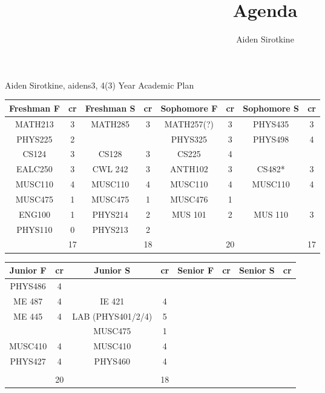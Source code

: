 \documentclass{article}
\date{}
\title{Agenda}
\author{Aiden Sirotkine}
\newcommand{\comment}[1]{}
\begin{document}
Aiden Sirotkine, aidens3, 4(3) Year Academic Plan
\begin{center}
\begin{tabular}{| c | c | c | c | c | c | c | c |}
Freshman F& cr & Freshman S & cr & Sophomore F & cr & Sophomore S & cr  \\ \hline
MATH213 & 3 & MATH285 & 3 & MATH257(?) & 3 & PHYS435& 3\\ \hline
PHYS225 & 2 & & & PHYS325 & 3 & PHYS498 & 4\\ \hline
CS124 & 3 & CS128 & 3 & CS225 & 4 &  & \\ \hline
EALC250 & 3 & CWL 242 & 3 & ANTH102 & 3 & CS482* & 3 \\ \hline
MUSC110 & 4 & MUSC110 & 4 & MUSC110 & 4 & MUSC110 & 4\\ \hline
MUSC475 & 1 & MUSC475 & 1 & MUSC476 & 1 & & \\ \hline
ENG100 & 1 & PHYS214 & 2 & MUS 101 & 2 & MUS 110 & 3 \\ \hline
PHYS110 & 0 & PHYS213 & 2\\ \hline
 & 17 & & 18 & & 20 & & 17 \\ \hline


\end{tabular}
\end{center}

\begin{center}
\begin{tabular}{| c | c | c | c | c | c | c | c |}
Junior F& cr & Junior S & cr & Senior F & cr & Senior S & cr  \\ \hline
PHYS486 & 4 & \comment{PHYS487 (O)} & \comment{4}\\ \hline
ME 487 & 4 & IE 421 & 4 \\  \hline
ME 445 & 4 & LAB (PHYS401/2/4) & 5 	\\ \hline
 &  & MUSC475 & 1 \\ \hline
MUSC410 & 4 & MUSC410 & 4 \\ \hline
PHYS427 & 4 & PHYS460 & 4 \\ \hline
 & & & \\ \hline
& 20 & & 18 \\ \hline


\end{tabular}
\end{center}


\end{document}
